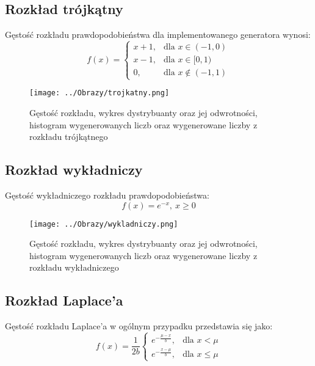 \documentclass[12pt,a4paper]{article}
\begin{document}
\subsection{Rozkład trójkątny}
Gęstość rozkładu prawdopodobieństwa dla implementowanego generatora wynosi:
\begin{equation}\label{eq:trojkatny}
f(x) = \begin{cases} x + 1, & \mbox{dla } x \in (-1,0) \\ x - 1, & \mbox{dla } x \in [0,1) \\ 0, & \mbox{dla } x \not\in (-1,1) \end{cases}
\end{equation}

\begin{figure}[H]
\centering
\texttt{[image: ../Obrazy/trojkatny.png]} 
\caption{Gęstość rozkładu, wykres dystrybuanty oraz jej odwrotności, histogram wygenerowanych liczb oraz wygenerowane liczby z rozkładu trójkątnego}
\label{fig:trojkatnyL2}
\end{figure}

\subsection{Rozkład wykładniczy}
Gęstość wykładniczego rozkładu prawdopodobieństwa:
\begin{equation}
f(x) = e^{-x},\ x \geq 0
\end{equation}

\begin{figure}[H]
\centering
\texttt{[image: ../Obrazy/wykladniczy.png]} 
\caption{Gęstość rozkładu, wykres dystrybuanty oraz jej odwrotności, histogram wygenerowanych liczb oraz wygenerowane liczby z rozkładu wykładniczego}
\label{fig:wykladniczyL2}
\end{figure}

\subsection{Rozkład Laplace'a}
Gęstość rozkładu Laplace'a w ogólnym przypadku przedstawia się jako:
\begin{equation}
f(x) = \frac{1}{2b}\begin{cases} e^{-\frac{\mu-x}{b}}, & \mbox{dla } x < \mu \\ e^{-\frac{x-\mu}{b}}, & \mbox{dla } x \leq \mu\end{cases}
\end{equation}
\end{document}
